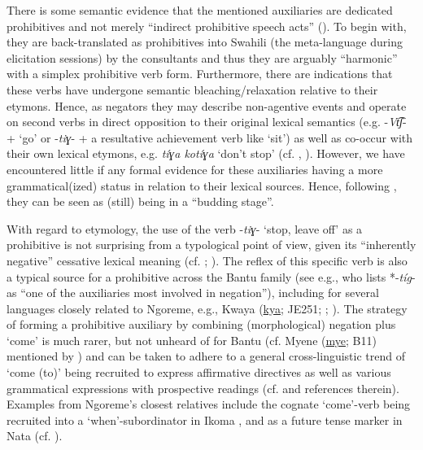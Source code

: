 \documentclass[output=paper,colorlinks,citecolor=brown,draftmode]{langscibook}
\begin{document}
There is some semantic evidence that the mentioned auxiliaries are dedicated prohibitives and not merely “indirect prohibitive speech acts” (\citealt[89]{Auwera2010}). To begin with, they are back-translated as prohibitives into Swahili (the meta-language during elicitation sessions) by the consultants and thus they are arguably “harmonic” with a simplex prohibitive verb form. Furthermore, there are indications that these verbs have undergone semantic bleaching/relaxation relative to their etymons. Hence, as negators they may describe non-agentive events and operate on second verbs in direct opposition to their original lexical semantics (e.g. \nobreakdash-\textit{Vt͡ʃ}\nobreakdash- + ‘go’ or \nobreakdash-\textit{tiɣ}\nobreakdash- + a resultative achievement verb like ‘sit’) as well as co-occur with their own lexical etymons, e.g. \textit{tíɣa kotíɣa} ‘don’t stop’ (cf. \citealt[60--61]{Heine1993}, \citeyear{Heine2002}). However, we have encountered little if any formal evidence for these auxiliaries having a more grammatical(ized) status in relation to their lexical sources. Hence, following \citet[61]{Heine1993}, they can be seen as (still) being in a “budding stage”.

With regard to etymology, the use of the verb \nobreakdash-\textit{tiɣ}\nobreakdash- ‘stop, leave off’ as a prohibitive is not surprising from a typological point of view, given its “inherently negative” cessative lexical meaning (cf. \citealt[358--359]{Aikhenvald2010}; \citealt{Auwera2010}). The reflex of this specific verb is also a typical source for a prohibitive across the Bantu family (see e.g., \citealt[183]{Nurse2008} who lists *\nobreakdash-\textit{tíg}\nobreakdash- as “one of the auxiliaries most involved in negation”), including for several languages closely related to Ngoreme, e.g., Kwaya (\href{https://iso639-3.sil.org/code/kya}{kya}; JE251; \citealt{Sillery1932}; \citealt{Odom2016}). The strategy of forming a prohibitive auxiliary by combining (morphological) negation plus ‘come’ is much rarer, but not unheard of for Bantu (cf. Myene (\href{https://iso639-3.sil.org/code/mye}{mye}; B11) mentioned by \citet{DevosVanOlmen2013}) and can be taken to adhere to a general cross-linguistic trend of ‘come (to)’ being recruited to express affirmative directives as well as various grammatical expressions with prospective readings (cf. \citealt[92--94, 101--107]{KutevaEtAl2019} and references therein). Examples from Ngoreme’s closest relatives include the cognate ‘come’-verb being recruited into a ‘when’-subordinator in Ikoma \citep{Robinson2015}, and as a future tense marker in Nata (cf. \citealt{Osa-GomezdelCampo2014}).
 
\end{document}
